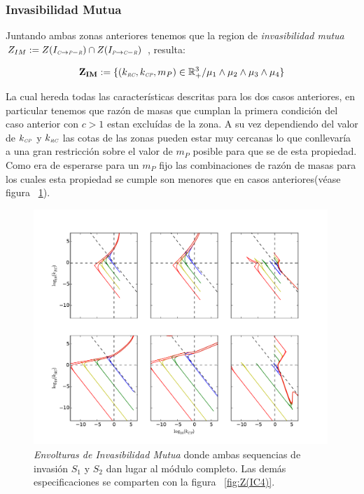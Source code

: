 \subsubsection{Invasibilidad Mutua}

Juntando ambas zonas anteriores tenemos que la region de \emph{invasibilidad mutua} $Z_{IM} := Z(I_{\textit{\tiny C} \to \textit{\tiny P}-\textit{\tiny R}}) \cap Z(I_{\textit{\tiny P} \to \textit{\tiny C}-\textit{\tiny R}})$ , resulta:

\begin{equation}
\mathbf{Z_{IM}} := \{ (k_{\textit{\tiny RC}},k_{\textit{\tiny CP}},m_P) \in \mathbb{R}^3_+ / \mu_1 \land \mu_2 \land \mu_3 \land \mu_4 \}
\end{equation}

La cual hereda todas las caracter\'isticas descritas para los dos casos anteriores, en particular tenemos que raz\'on de masas que cumplan la primera condici\'on del caso anterior con $c > 1$ estan exclu\'idas de la zona. A su vez dependiendo del valor de $k_{\textit{\tiny CP}}$ y $k_{\textit{\tiny RC}}$ las cotas de las zonas pueden estar muy cercanas lo que conllevar\'ia a una gran restricci\'on sobre el valor de $m_P$ posible para que se de esta propiedad. Como era de esperarse para un $m_P$ fijo las combinaciones de raz\'on de masas para los cuales esta propiedad se cumple son menores que en casos anteriores(v\'ease figura ~\ref{fig:MutualInv}).


\begin{figure}
  \centering
  \includegraphics[width = 0.99\textwidth]{./Plots/MutualInvAcGrGr.pdf}
  \caption[Env $I_M$]{\emph{Envolturas de Invasibilidad Mutua} donde ambas sequencias de invasi\'on $S_1$ y $S_2$ dan lugar al m\'odulo completo. Las dem\'as especificaciones se comparten con la figura ~\ref{fig:Z(IC4)}.}
  \label{fig:MutualInv}
\end{figure}


